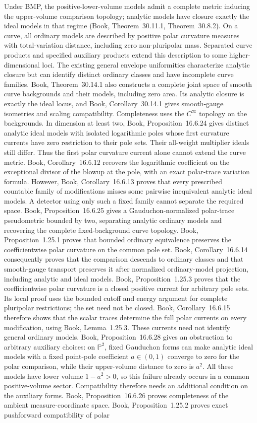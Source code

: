 \documentclass[11pt]{article}
\begin{document}
Under BMP, the positive-lower-volume models admit a complete metric inducing the upper-volume comparison topology; analytic models have closure exactly the ideal models in that regime (Book, Theorem~30.11.1, Theorem~30.8.2). On a curve, all ordinary models are described by positive polar curvature measures with total-variation distance, including zero non-pluripolar mass. Separated curve products and specified auxiliary products extend this description to some higher-dimensional loci. The existing general envelope uniformities characterize analytic closure but can identify distinct ordinary classes and have incomplete curve families. Book, Theorem~30.14.1 also constructs a complete joint space of smooth curve backgrounds and their models, including zero area. Its analytic closure is exactly the ideal locus, and Book, Corollary~30.14.1 gives smooth-gauge isometries and scaling compatibility. Completeness uses the $C^\infty$ topology on the backgrounds. In dimension at least two, Book, Proposition~16.6.24 gives distinct analytic ideal models with isolated logarithmic poles whose first curvature currents have zero restriction to their pole sets. Their all-weight multiplier ideals still differ. Thus the first polar curvature current alone cannot extend the curve metric. Book, Corollary~16.6.12 recovers the logarithmic coefficient on the exceptional divisor of the blowup at the pole, with an exact polar-trace variation formula. However, Book, Corollary~16.6.13 proves that every prescribed countable family of modifications misses some pairwise inequivalent analytic ideal models. A detector using only such a fixed family cannot separate the required space. Book, Proposition~16.6.25 gives a Gauduchon-normalized polar-trace pseudometric bounded by two, separating analytic ordinary models and recovering the complete fixed-background curve topology. Book, Proposition~1.25.1 proves that bounded ordinary equivalence preserves the coefficientwise polar curvature on the common pole set. Book, Corollary~16.6.14 consequently proves that the comparison descends to ordinary classes and that smooth-gauge transport preserves it after normalized ordinary-model projection, including analytic and ideal models. Book, Proposition~1.25.3 proves that the coefficientwise polar curvature is a closed positive current for arbitrary pole sets. Its local proof uses the bounded cutoff and energy argument for complete pluripolar restrictions; the set need not be closed. Book, Corollary~16.6.15 therefore shows that the scalar traces determine the full polar currents on every modification, using Book, Lemma~1.25.3. These currents need not identify general ordinary models. Book, Proposition~16.6.28 gives an obstruction to arbitrary auxiliary choices: on $\mathbb P^2$, fixed Gauduchon forms can make analytic ideal models with a fixed point-pole coefficient $a\in(0,1)$ converge to zero for the polar comparison, while their upper-volume distance to zero is $a^2$. All these models have lower volume $1-a^2>0$, so this failure already occurs in a common positive-volume sector. Compatibility therefore needs an additional condition on the auxiliary forms. Book, Proposition~16.6.26 proves completeness of the ambient measure-coordinate space. Book, Proposition~1.25.2 proves exact pushforward compatibility of polar 
\end{document}
